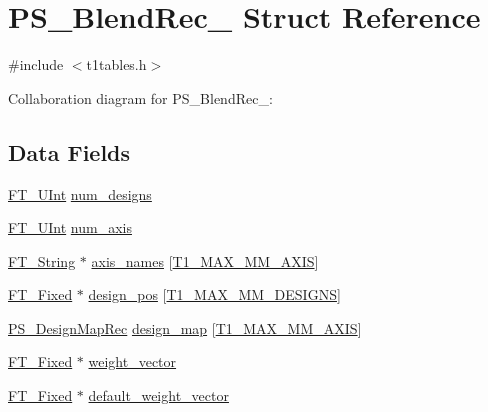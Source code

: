 \hypertarget{struct_p_s___blend_rec__}{}\section{P\+S\+\_\+\+Blend\+Rec\+\_\+ Struct Reference}
\label{struct_p_s___blend_rec__}


{\ttfamily \#include $<$t1tables.\+h$>$}



Collaboration diagram for P\+S\+\_\+\+Blend\+Rec\+\_\+\+:
\subsection*{Data Fields}
\begin{DoxyCompactItemize}
\item 
\hyperlink{fttypes_8h_abcb8db4dbf35d2b55a9e8c7b0926dc52}{F\+T\+\_\+\+U\+Int} \hyperlink{struct_p_s___blend_rec___ad81cbf3697f89908e9c15071e2ab9cac}{num\+\_\+designs}
\item 
\hyperlink{fttypes_8h_abcb8db4dbf35d2b55a9e8c7b0926dc52}{F\+T\+\_\+\+U\+Int} \hyperlink{struct_p_s___blend_rec___af9b375493ee2d450cabbc571473e4006}{num\+\_\+axis}
\item 
\hyperlink{fttypes_8h_a9846214585359eb2ba6bbb0e6de30639}{F\+T\+\_\+\+String} $\ast$ \hyperlink{struct_p_s___blend_rec___afc0e4018ff3439f306d61e3c219b91f9}{axis\+\_\+names} \mbox{[}\hyperlink{t1tables_8h_a471108ae668a65363dd36bb17e1ecbbe}{T1\+\_\+\+M\+A\+X\+\_\+\+M\+M\+\_\+\+A\+X\+IS}\mbox{]}
\item 
\hyperlink{fttypes_8h_a5f5a679cc09f758efdd0d1c5feed3c3d}{F\+T\+\_\+\+Fixed} $\ast$ \hyperlink{struct_p_s___blend_rec___ad0e6c9b9d42346fd8a3371a5b2473e3c}{design\+\_\+pos} \mbox{[}\hyperlink{t1tables_8h_a933ca229674aa312fd5546fadc95e08f}{T1\+\_\+\+M\+A\+X\+\_\+\+M\+M\+\_\+\+D\+E\+S\+I\+G\+NS}\mbox{]}
\item 
\hyperlink{t1tables_8h_a94de6b0634fcae90953c7427cdb28eee}{P\+S\+\_\+\+Design\+Map\+Rec} \hyperlink{struct_p_s___blend_rec___a005c783c65e5dd35611e88901b5db2ca}{design\+\_\+map} \mbox{[}\hyperlink{t1tables_8h_a471108ae668a65363dd36bb17e1ecbbe}{T1\+\_\+\+M\+A\+X\+\_\+\+M\+M\+\_\+\+A\+X\+IS}\mbox{]}
\item 
\hyperlink{fttypes_8h_a5f5a679cc09f758efdd0d1c5feed3c3d}{F\+T\+\_\+\+Fixed} $\ast$ \hyperlink{struct_p_s___blend_rec___ae3dcbb2aaee676fdc3d5bde890b2cc78}{weight\+\_\+vector}
\item 
\hyperlink{fttypes_8h_a5f5a679cc09f758efdd0d1c5feed3c3d}{F\+T\+\_\+\+Fixed} $\ast$ \hyperlink{struct_p_s___blend_rec___a29c19d988e8ee1eb4f333b1ac55759de}{default\+\_\+weight\+\_\+vector}

\end{DoxyCompactItemize}
